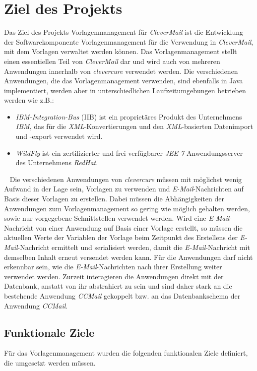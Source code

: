 \chapter{Ziel des Projekts}
\label{cha:Zielsetzung}
Das Ziel des Projekts Vorlagenmanagement für \emph{CleverMail} ist die Entwicklung der Softwarekomponente Vorlagenmanagement für die Verwendung in \emph{CleverMail}, mit dem Vorlagen verwaltet werden können. Das Vorlagenmanagement stellt einen essentiellen Teil von \emph{CleverMail} dar und wird auch von mehreren Anwendungen innerhalb von \emph{clevercure} verwendet werden. Die verschiedenen Anwendungen, die das Vorlagenmanagement verwenden, sind ebenfalls in Java implementiert, werden aber in unterschiedlichen Laufzeitumgebungen betrieben werden wie z.B.:
\begin{itemize}
	\item \emph{IBM-Integration-Bus} (IIB) ist ein proprietäres Produkt des Unternehmens \emph{IBM}, das für die \emph{XML}-Konvertierungen und den \emph{XML}-basierten Datenimport und -export verwendet wird.
	\item \emph{WildFly} ist ein zertifizierter und frei verfügbarer \emph{JEE-7} Anwendungsserver des Unternehmens \emph{RedHat}.
\end{itemize} 
\ \newline
Die verschiedenen Anwendungen von \emph{clevercure} müssen mit möglichst wenig Aufwand in der Lage sein, Vorlagen zu verwenden und \emph{E-Mail}-Nachrichten auf Basis dieser Vorlagen zu erstellen. Dabei müssen die Abhängigkeiten der Anwendungen zum Vorlagenmanagement so gering wie möglich gehalten werden, sowie nur vorgegebene Schnittstellen verwendet werden. Wird eine \emph{E-Mail}-Nachricht von einer Anwendung auf Basis einer Vorlage erstellt, so müssen die  aktuellen Werte der Variablen der Vorlage beim Zeitpunkt des Erstellens der \emph{E-Mail}-Nachricht ermittelt und serialisiert werden, damit die \emph{E-Mail}-Nachricht mit demselben Inhalt erneut versendet werden kann. Für die Anwendungen darf nicht erkennbar sein, wie die \emph{E-Mail}-Nachrichten nach ihrer Erstellung weiter verwendet werden.
\newline
\newline
Zurzeit interagieren die Anwendungen direkt mit der Datenbank, anstatt von ihr abstrahiert zu sein und sind daher stark an die bestehende Anwendung \emph{CCMail} gekoppelt bzw. an das Datenbankschema der Anwendung \emph{CCMail}.
\newpage

\section{Funktionale Ziele}
Für das Vorlagenmanagement wurden die folgenden funktionalen Ziele definiert, die umgesetzt werden müssen.

